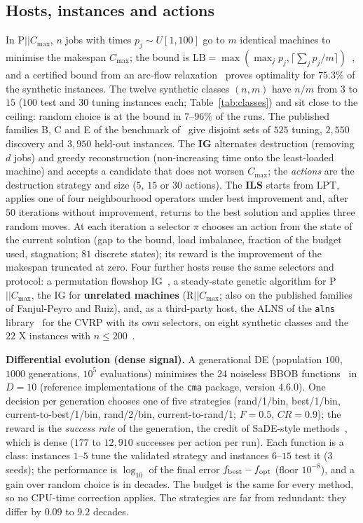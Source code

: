 \documentclass[conference,a4paper]{IEEEtran}
\newcommand{\Cmax}{C_{\max}}
\begin{document}
\subsection{Hosts, instances and actions}
\label{sec:hosts}
In P$||\Cmax$, $n$ jobs with times $p_j\sim U[1,100]$ go to $m$ identical machines to minimise the makespan $\Cmax$; the bound is $\mathrm{LB}=\max(\max_jp_j,\lceil\sum_jp_j/m\rceil)$~\cite{Graham1969}, and a certified bound from an arc-flow relaxation~\cite{MradSouayah2018} proves optimality for $75.3\%$ of the synthetic instances.
The twelve synthetic classes $(n,m)$ have $n/m$ from $3$ to $15$ ($100$ test and $30$ tuning instances each; Table~\ref{tab:classes}) and sit close to the ceiling: random choice is at the bound in $7$--$96\%$ of the runs.
The published families B, C and E of the benchmark of~\cite{OstojicEtAl2025} give disjoint sets of $525$ tuning, $2{,}550$ discovery and $3{,}950$ held-out instances.
The \textbf{IG} alternates destruction (removing $d$ jobs) and greedy reconstruction (non-increasing time onto the least-loaded machine) and accepts a candidate that does not worsen $\Cmax$; the \emph{actions} are the destruction strategy and size ($5$, $15$ or $30$ actions).
The \textbf{ILS} starts from LPT, applies one of four neighbourhood operators under best improvement and, after $50$ iterations without improvement, returns to the best solution and applies three random moves.
At each iteration a selector $\pi$ chooses an action from the state of the current solution (gap to the bound, load imbalance, fraction of the budget used, stagnation; $81$ discrete states); its reward is the improvement of the makespan truncated at zero.
Four further hosts reuse the same selectors and protocol: a permutation flowshop IG~\cite{RuizStutzle2007}, a steady-state genetic algorithm for P$||\Cmax$, the IG for \textbf{unrelated machines} (R$||\Cmax$; also on the published families of Fanjul-Peyro and Ruiz), and, as a third-party host, the ALNS of the \texttt{alns} library~\cite{WoudaLan2023} for the CVRP with its own selectors, on eight synthetic classes and the $22$ X instances with $n\le200$~\cite{UchoaEtal2017}.

\textbf{Differential evolution (dense signal).} A generational DE (population $100$, $1000$ generations, $10^5$ evaluations) minimises the $24$ noiseless BBOB functions~\cite{HansenEtal2009} in $D=10$ (reference implementations of the \texttt{cma} package, version 4.6.0). One decision per generation chooses one of five strategies (rand/1/bin, best/1/bin, current-to-best/1/bin, rand/2/bin, current-to-rand/1; $F=0.5$, $CR=0.9$); the reward is the \emph{success rate} of the generation, the credit of SaDE-style methods~\cite{QinEtal2009}, which is dense ($177$ to $12{,}910$ successes per action per run).
Each function is a class: instances $1$--$5$ tune the validated strategy and instances $6$--$15$ test it ($3$ seeds); the performance is $\log_{10}$ of the final error $f_{\rm best}-f_{\rm opt}$ (floor $10^{-8}$), and a gain over random choice is in decades.
The budget is the same for every method, so no CPU-time correction applies. The strategies are far from redundant: they differ by $0.09$ to $9.2$ decades.
\end{document}
